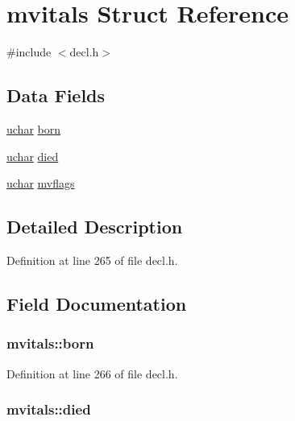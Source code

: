 \hypertarget{structmvitals}{\section{mvitals Struct Reference}
\label{structmvitals}
}


{\ttfamily \#include $<$decl.\+h$>$}

\subsection*{Data Fields}
\begin{DoxyCompactItemize}
\item 
\hyperlink{config_8h_a65f85814a8290f9797005d3b28e7e5fc}{uchar} \hyperlink{structmvitals_af01567cf023132ecac05b85abc3c3549}{born}
\item 
\hyperlink{config_8h_a65f85814a8290f9797005d3b28e7e5fc}{uchar} \hyperlink{structmvitals_aa0f6a023b807f36c252377132ed25e72}{died}
\item 
\hyperlink{config_8h_a65f85814a8290f9797005d3b28e7e5fc}{uchar} \hyperlink{structmvitals_a51369b55e24dc02d3f5768b8f5b01381}{mvflags}
\end{DoxyCompactItemize}


\subsection{Detailed Description}


Definition at line 265 of file decl.\+h.



\subsection{Field Documentation}
\hypertarget{structmvitals_af01567cf023132ecac05b85abc3c3549}{
\subsubsection[{born}]{ mvitals\+::born}}\label{structmvitals_af01567cf023132ecac05b85abc3c3549}


Definition at line 266 of file decl.\+h.

\hypertarget{structmvitals_aa0f6a023b807f36c252377132ed25e72}{
\subsubsection[{died}]{ mvitals\+::died}}\label{structmvitals_aa0f6a023b807f36c252377132ed25e72}


